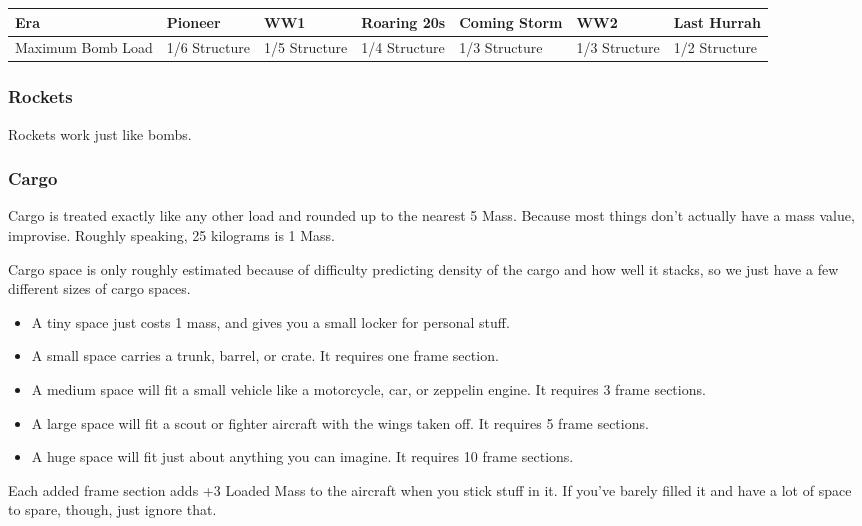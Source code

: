 \documentclass{article}
\begin{document}
\begin{tabular}{|l|l|l|l|l|l|l|}
  \hline
  Era               & Pioneer       & WW1           & Roaring 20s   & Coming Storm & WW2 & Last Hurrah \\\hline
  Maximum Bomb Load & 1/6 Structure & 1/5 Structure & 1/4 Structure & 1/3
  Structure         & 1/3 Structure & 1/2 Structure                                                    \\\hline
\end{tabular}

\subsubsection{Rockets}
\label{_Rockets}

Rockets work just like bombs.

\subsubsection{Cargo}
\label{_Cargo}

Cargo is treated exactly like any other load and rounded up to the
nearest 5 Mass. Because most things don't actually have a mass value,
improvise. Roughly speaking, 25 kilograms is 1 Mass.

Cargo space is only roughly estimated because of difficulty predicting
density of the cargo and how well it stacks, so we just have a few
different sizes of cargo spaces.

\begin{itemize}
  \item          A tiny space just costs 1 mass, and gives you a small locker
        for personal stuff.
  \item          A small space carries a trunk, barrel, or crate. It requires
        one frame section.
  \item          A medium space will fit a small vehicle like a motorcycle, car,
        or zeppelin engine. It requires 3 frame sections.
  \item          A large space will fit a scout or fighter aircraft with the
        wings taken off. It requires 5 frame sections.
  \item          A huge space will fit just about anything you can imagine. It
        requires 10 frame sections.
\end{itemize}

Each added frame section adds +3 Loaded Mass to the aircraft when you
stick stuff in it. If you've barely filled it and have a lot of space to
spare, though, just ignore that.
\end{document}
